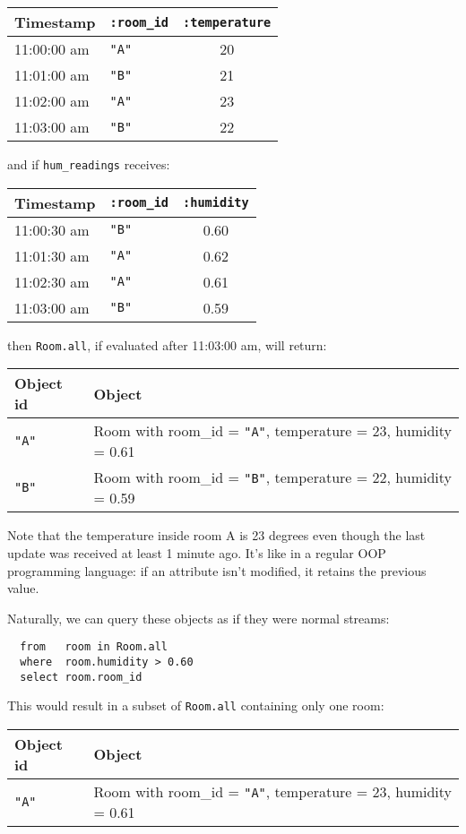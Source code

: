 \documentclass[a4,11pt]{report}
\begin{document}
\begin{tabular}{ |l|l|c| }
  \hline
  Timestamp & \verb=:room_id= & \verb=:temperature= \\
  \hline
  11:00:00 am & \verb="A"= & 20 \\
  11:01:00 am & \verb="B"= & 21 \\
  11:02:00 am & \verb="A"= & 23 \\
  11:03:00 am & \verb="B"= & 22 \\
  \hline
\end{tabular}

and if \verb=hum_readings= receives:

\begin{tabular}{ |l|l|c| }
  \hline
  Timestamp & \verb=:room_id= & \verb=:humidity= \\
  \hline
  11:00:30 am & \verb="B"= & 0.60 \\
  11:01:30 am & \verb="A"= & 0.62 \\
  11:02:30 am & \verb="A"= & 0.61 \\
  11:03:00 am & \verb="B"= & 0.59 \\
  \hline
\end{tabular}

then \verb=Room.all=, if evaluated after 11:03:00 am, will return:

\begin{tabular}{ |l|l| }
  \hline
  Object id & Object \\
  \hline
  \verb="A"= & Room with room\_id = \verb="A"=, temperature = 23, humidity = 0.61 \\
  \verb="B"= & Room with room\_id = \verb="B"=, temperature = 22, humidity = 0.59 \\
  \hline
\end{tabular}

Note that the temperature inside room A is 23 degrees even though the
last update was received at least 1 minute ago. It's like in a regular
OOP programming language: if an attribute isn't modified, it retains
the previous value.

Naturally, we can query these objects as if they were normal streams:

\begin{lstlisting}
  from   room in Room.all
  where  room.humidity > 0.60
  select room.room_id
\end{lstlisting}

This would result in a subset of \verb=Room.all= containing only one
room:

\begin{tabular}{ |l|l| }
  \hline
  Object id & Object \\
  \hline
  \verb="A"= & Room with room\_id = \verb="A"=, temperature = 23, humidity = 0.61 \\
  \hline
\end{tabular}
\end{document}
